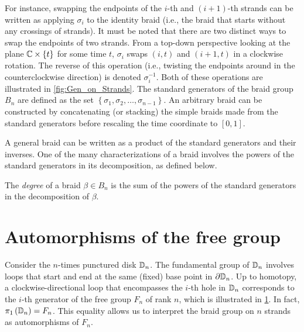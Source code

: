 For instance, swapping the endpoints of the $i$-th and $(i+1)$-th strands can be written as applying $\sigma_i$ to the identity braid (i.e., the braid that starts without any crossings of strands). It must be noted that there are two distinct ways to swap the endpoints of two strands. From a top-down perspective looking at the plane $\mathbb{C}\times\left\{ t \right\}$ for some time $t$, $\sigma_i$ swaps $(i,t)$ and $(i+1,t)$ in a clockwise rotation. The reverse of this operation (i.e., twisting the endpoints around in the counterclockwise direction) is denoted $\sigma_i^{-1}$. Both of these operations are illustrated in \cref{fig:Gen_on_Strands}. The standard generators of the braid group $B_n$ are defined as the set $\left\{ \sigma_1,\sigma_2,\dots,\sigma_{n-1} \right\}$. An arbitrary braid can be constructed by concatenating (or stacking) the simple braids made from the standard generators before rescaling the time coordinate to $[0,1]$.

A general braid can be written as a product of the standard generators and their inverses. One of the many characterizations of a braid involves the powers of the standard generators in its decomposition, as defined below.
\begin{definition}
    The \textit{degree} of a braid $\beta\in B_n$ is the sum of the powers of the standard generators in the decomposition of $\beta$.
\end{definition}

\section{Automorphisms of the free group}\label{sec:Aut_Fn}

Consider the $n$-times punctured disk $\mathbb{D}_n$. The fundamental group of $\mathbb{D}_n$ involves loops that start and end at the same (fixed) base point in $\partial\mathbb{D}_n$. Up to homotopy, a clockwise-directional loop that encompasses the $i$-th hole in $\mathbb{D}_n$ corresponds to the $i$-th generator of the free group $F_n$ of rank $n$, which is illustrated in \cref{fig:Gen_on_Dn}. In fact, $\pi_1\left( \mathbb{D}_n \right) = F_n$. This equality allows us to interpret the braid group on $n$ strands as automorphisms of $F_n$.

\begin{figure}[htbp]
    \centering
    
    \label{fig:Gen_on_Dn}
\end{figure}

